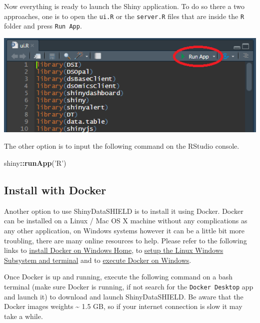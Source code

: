 \documentclass[
]{book}
\newenvironment{Shaded}{\begin{snugshade}}{\end{snugshade}}
\newcommand{\KeywordTok}[1]{\textcolor[rgb]{0.13,0.29,0.53}{\textbf{#1}}}
\newcommand{\NormalTok}[1]{#1}
\newcommand{\OperatorTok}[1]{\textcolor[rgb]{0.81,0.36,0.00}{\textbf{#1}}}
\newcommand{\StringTok}[1]{\textcolor[rgb]{0.31,0.60,0.02}{#1}}
\begin{document}
Now everything is ready to launch the Shiny application. To do so there a two approaches, one is to open the \texttt{ui.R} or the \texttt{server.R} files that are inside the \texttt{R} folder and press \texttt{Run\ App}.

\includegraphics{images/setup2.png}

The other option is to input the following command on the RStudio console.

\begin{Shaded}
\begin{Highlighting}[]
\NormalTok{shiny}\OperatorTok{::}\KeywordTok{runApp}\NormalTok{(}\StringTok{'R'}\NormalTok{)}
\end{Highlighting}
\end{Shaded}

\hypertarget{install-with-docker}{%
\subsection{Install with Docker}\label{install-with-docker}}

Another option to use ShinyDataSHIELD is to install it using Docker. Docker can be installed on a Linux / Mac OS X machine without any complications as any other application, on Windows systems however it can be a little bit more troubling, there are many online resources to help. Please refer to the following links to \href{https://docs.docker.com/docker-for-windows/install-windows-home/}{install Docker on Windows Home}, to \href{https://blog.nillsf.com/index.php/2020/02/17/setting-up-wsl2-windows-terminal-and-oh-my-zsh/}{setup the Linux Windows Subsystem and terminal} and to \href{https://docs.docker.com/docker-for-windows/wsl/}{execute Docker on Windows}.

Once Docker is up and running, execute the following command on a bash terminal (make sure Docker is running, if not search for the \texttt{Docker\ Desktop} app and launch it) to download and launch ShinyDataSHIELD. Be aware that the Docker images weights \textasciitilde{} 1.5 GB, so if your internet connection is slow it may take a while.
\end{document}
